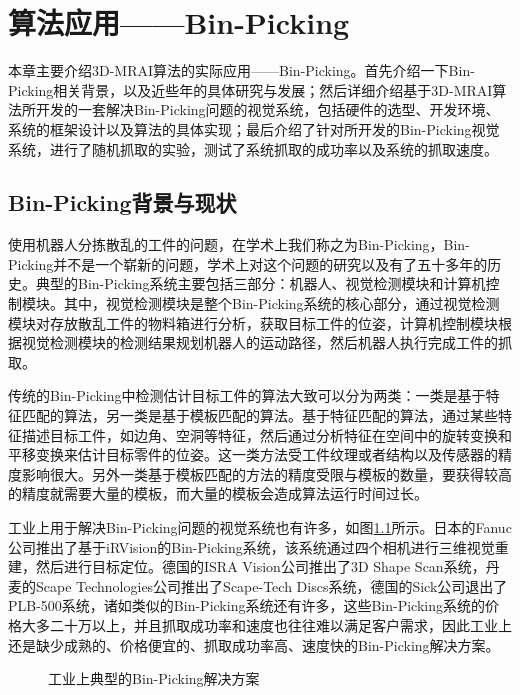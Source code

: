 \chapter{算法应用——Bin-Picking}
\label{chap:app}
本章主要介绍3D-MRAI算法的实际应用——Bin-Picking。首先介绍一下Bin-Picking相关背景，以及近些年的具体研究与发展；然后详细介绍基于3D-MRAI算法所开发的一套解决Bin-Picking问题的视觉系统，包括硬件的选型、开发环境、系统的框架设计以及算法的具体实现；最后介绍了针对所开发的Bin-Picking视觉系统，进行了随机抓取的实验，测试了系统抓取的成功率以及系统的抓取速度。

\section{Bin-Picking背景与现状}
使用机器人分拣散乱的工件的问题，在学术上我们称之为Bin-Picking，Bin-Picking并不是一个崭新的问题，学术上对这个问题的研究以及有了五十多年的历史。典型的Bin-Picking系统主要包括三部分：机器人、视觉检测模块和计算机控制模块。其中，视觉检测模块是整个Bin-Picking系统的核心部分，通过视觉检测模块对存放散乱工件的物料箱进行分析，获取目标工件的位姿，计算机控制模块根据视觉检测模块的检测结果规划机器人的运动路径，然后机器人执行完成工件的抓取。

传统的Bin-Picking中检测估计目标工件的算法大致可以分为两类：一类是基于特征匹配的算法，另一类是基于模板匹配的算法。基于特征匹配的算法，通过某些特征描述目标工件，如边角、空洞等特征，然后通过分析特征在空间中的旋转变换和平移变换来估计目标零件的位姿。这一类方法受工件纹理或者结构以及传感器的精度影响很大。另外一类基于模板匹配的方法的精度受限与模板的数量，要获得较高的精度就需要大量的模板，而大量的模板会造成算法运行时间过长。

工业上用于解决Bin-Picking问题的视觉系统也有许多，如图\ref{fig:bin-picking-sys}所示。日本的Fanuc公司推出了基于iRVision的Bin-Picking系统，该系统通过四个相机进行三维视觉重建，然后进行目标定位\cite{connolly2007new}。德国的ISRA Vision公司推出了3D Shape Scan系统，丹麦的Scape Technologies公司推出了Scape-Tech Discs系统，德国的Sick公司退出了PLB-500系统，诸如类似的Bin-Picking系统还有许多，这些Bin-Picking系统的价格大多二十万以上，并且抓取成功率和速度也往往难以满足客户需求，因此工业上还是缺少成熟的、价格便宜的、抓取成功率高、速度快的Bin-Picking解决方案。
\begin{figure}[ht]
  \centering
  \hskip1.5cm
  \vfill
  \hskip1.5cm
  \caption{工业上典型的Bin-Picking解决方案}
  \label{fig:bin-picking-sys}
\end{figure}

